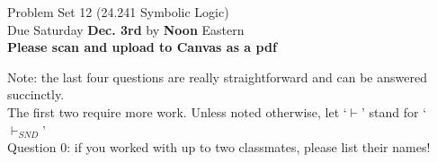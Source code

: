 \documentclass[12pt]{article}
\begin{document}

%
\newcommand{\detritus}[1]{}


\thispagestyle{empty}



\iffalse
\parindent = 0pt
\hspace*{0.0in}\parbox[t]{2.5in}{
Philosophy 24.241\\[3pt]
Symbolic Logic\\[3pt]
Fall, 2022
}
\fi 


\iffalse 
\begin{center}
\Large\bf Problem Set 12 \large{(24.241 Symbolic Logic)}\\[1ex] 
 Due Saturday {\bf{December 3rd}} by noon Eastern\\[3ex]
\end{center}
\fi

\begin{center}
\Large Problem Set 12 \large{(24.241 Symbolic Logic)} \\[1ex] 
 Due Saturday \textbf{Dec. 3rd} by \textbf{Noon} Eastern\\ \normalsize{\textbf{Please scan and upload to Canvas as a pdf}} %
\end{center}

Note: the last four questions are really straightforward and can be answered succinctly. \\ The first two require more work.  Unless noted otherwise, let `$\vdash$' stand for `$\vdash_{SND}$' \\%

Question 0: if you worked with up to two classmates, please list their names!

\medskip

\end{document}
